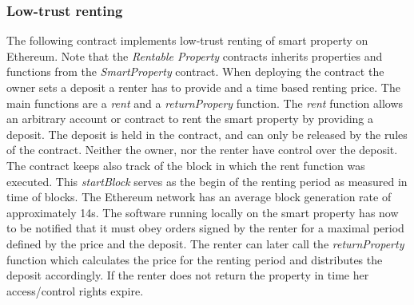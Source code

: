 

\subsubsection{Low-trust renting}

The following contract implements low-trust renting of smart property on Ethereum. Note that the \emph{Rentable Property} contracts inherits properties and functions from the \emph{SmartProperty} contract. When deploying the contract the owner sets a deposit a renter has to provide and a time based renting price. The main functions are a \emph{rent} and a \emph{returnPropery} function. The \emph{rent} function allows an arbitrary account or contract to rent the smart property by providing a deposit. The deposit is held in the contract, and can only be released by the rules of the contract. Neither the owner, nor the renter have control over the deposit. The contract keeps also track of the block in which the rent function was executed. This \emph{startBlock} serves as the begin of the renting period as measured in time of blocks. The Ethereum network has an average block generation rate of approximately 14s. 
The software running locally on the smart property has now to be notified that it must obey orders signed by the renter for a maximal period defined by the price and the deposit. 
The renter can later call the \emph{returnProperty} function which calculates the price for the renting period and distributes the deposit accordingly. If the renter does not return the property in time her access/control rights expire. 

